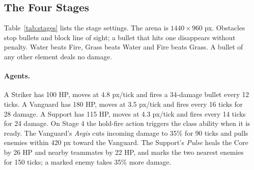 \documentclass[11pt]{article}
\begin{document}
\subsection{The Four Stages}

Table~\ref{tab:stages} lists the stage settings. The arena is $1440 \times 960$ px. Obstacles stop bullets and block line of sight; a bullet that hits one disappears without penalty. Water beats Fire, Grass beats Water and Fire beats Grass. A bullet of any other element deals no damage.

\begin{table}[t]
\centering
\caption{Stage settings in DotShot v2.2.}
\label{tab:stages}
\small
{}
\end{table}

\paragraph{Agents.} A Striker has 100 HP, moves at 4.8 px/tick and fires a 34-damage bullet every 12 ticks. A Vanguard has 180 HP, moves at 3.5 px/tick and fires every 16 ticks for 28 damage. A Support has 115 HP, moves at 4.3 px/tick and fires every 14 ticks for 24 damage. On Stage 4 the hold-fire action triggers the class ability when it is ready. The Vanguard's \emph{Aegis} cuts incoming damage to 35\% for 90 ticks and pulls enemies within 420 px toward the Vanguard. The Support's \emph{Pulse} heals the Core by 26 HP and nearby teammates by 22 HP, and marks the two nearest enemies for 150 ticks; a marked enemy takes 35\% more damage.
\end{document}
